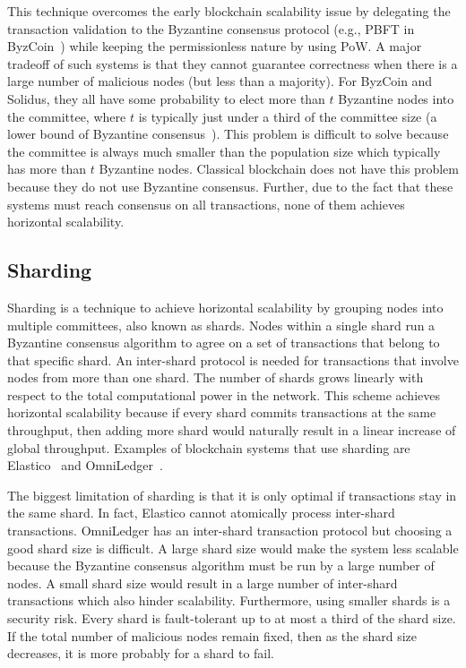This technique overcomes the early blockchain scalability issue by delegating the transaction validation to the Byzantine consensus protocol (e.g., PBFT in ByzCoin~\cite{kogias2016enhancing})
while keeping the permissionless nature by using PoW.
A major tradeoff of such systems is that they cannot guarantee correctness when there is a large number of malicious nodes (but less than a majority).
For ByzCoin and Solidus, they all have some probability to elect more than $t$ Byzantine nodes into the committee,
where $t$ is typically just under a third of the committee size (a lower bound of Byzantine consensus~\cite{pease1980reaching}).
This problem is difficult to solve because the committee is always much smaller than the population size which typically has more than $t$ Byzantine nodes.
Classical blockchain does not have this problem because they do not use Byzantine consensus.
Further, due to the fact that these systems must reach consensus on all transactions, none of them achieves horizontal scalability.

\subsection{Sharding}
\label{sec:sharding}

Sharding is a technique to achieve horizontal scalability by grouping nodes into multiple committees, also known as shards.
Nodes within a single shard run a Byzantine consensus algorithm to agree on a set of transactions that belong to that specific shard.
An inter-shard protocol is needed for transactions that involve nodes from more than one shard.
The number of shards grows linearly with respect to the total computational power in the network.
This scheme achieves horizontal scalability because if every shard commits transactions at the same throughput,
then adding more shard would naturally result in a linear increase of global throughput.
Examples of blockchain systems that use sharding are Elastico~\cite{luu2016elastico} and Omni\-Ledger~\cite{kokoris2017omniledger}.

The biggest limitation of sharding is that it is only optimal if transactions stay in the same shard.
In fact, Elastico cannot atomically process inter-shard transactions.
OmniLedger has an inter-shard transaction protocol but choosing a good shard size is difficult.
A large shard size would make the system less scalable because the Byzantine consensus algorithm must be run by a large number of nodes.
A small shard size would result in a large number of inter-shard transactions which also hinder scalability.
Furthermore, using smaller shards is a security risk.
Every shard is fault-tolerant up to at most a third of the shard size.
If the total number of malicious nodes remain fixed, then as the shard size decreases,
it is more probably for a shard to fail.

